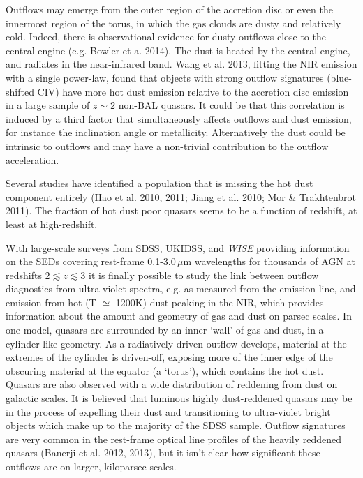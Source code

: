 Outflows may emerge from the outer region of the accretion disc or even the innermost region of the torus, in which the gas clouds are dusty and relatively cold.  
Indeed, there is observational evidence for dusty outflows close to the central engine (e.g. Bowler et a. 2014). The dust is heated by the central engine, and radiates in the near-infrared band. 
Wang et al. 2013, fitting the NIR emission with a single power-law, found that objects with strong outflow signatures (blue-shifted CIV) have more hot dust emission relative to the accretion disc emission in a large sample of $z \sim 2$ non-BAL quasars. 
It could be that this correlation is induced by a third factor that simultaneously affects outflows and dust emission, for instance the inclination angle or metallicity. 
Alternatively the dust could be intrinsic to outflows and may have a non-trivial contribution to the outflow acceleration.

Several studies have identified a population that is missing the hot dust component entirely (Hao et al. 2010, 2011; Jiang et al. 2010; Mor \& Trakhtenbrot 2011). 
The fraction of hot dust poor quasars seems to be a function of redshift, at least at high-redshift. 

With large-scale surveys from SDSS, UKIDSS, and \textit{WISE} providing information on the SEDs covering rest-frame 0.1-3.0\,$\mu$m wavelengths for thousands of AGN at redshifts $2 \lesssim z \lesssim 3$ it is finally possible to study the link between outflow diagnostics from ultra-violet spectra, e.g. as measured from the  emission line, and emission from hot (T $\simeq$ 1200K) dust peaking in the NIR, which provides information about the amount and geometry of gas and dust on parsec scales. 
In one model, quasars are surrounded by an inner `wall' of gas and dust, in a cylinder-like geometry. 
As a radiatively-driven outflow develops, material at the extremes of the cylinder is driven-off, exposing more of the inner edge of the obscuring material at the equator (a `torus'), which contains the hot dust. 
Quasars are also observed with a wide distribution of reddening from dust on galactic scales. 
It is believed that luminous highly dust-reddened quasars may be in the process of expelling their dust and transitioning to ultra-violet bright objects which make up to the majority of the SDSS sample. 
Outflow signatures are very common in the rest-frame optical \ha line profiles of the heavily reddened quasars (Banerji et al. 2012, 2013), but it isn't clear how significant these outflows are on larger, kiloparsec scales.

